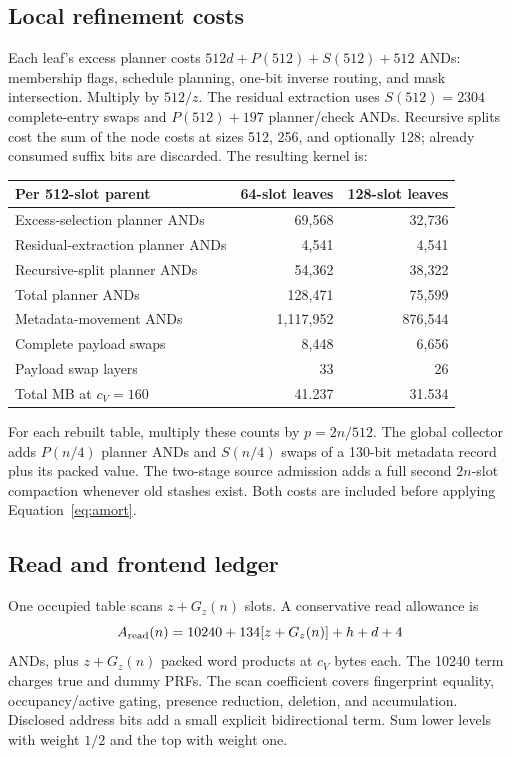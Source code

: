 \documentclass[11pt]{article}
\begin{document}
\subsection{Local refinement costs}
Each leaf's excess planner costs
$512d+P(512)+S(512)+512$ ANDs: membership flags, schedule planning,
one-bit inverse routing, and mask intersection. Multiply by $512/z$.
The residual extraction uses $S(512)=2304$ complete-entry swaps and
$P(512)+197$ planner/check ANDs. Recursive splits cost the sum of the
node costs at sizes 512, 256, and optionally 128; already consumed suffix
bits are discarded. The resulting kernel is:
\begin{center}\small
\begin{tabular}{lrr}\toprule
Per 512-slot parent & 64-slot leaves & 128-slot leaves\\\midrule
Excess-selection planner ANDs & 69,568 & 32,736\\
Residual-extraction planner ANDs & 4,541 & 4,541\\
Recursive-split planner ANDs & 54,362 & 38,322\\
Total planner ANDs & 128,471 & 75,599\\
Metadata-movement ANDs & 1,117,952 & 876,544\\
Complete payload swaps & 8,448 & 6,656\\
Payload swap layers & 33 & 26\\
Total MB at $c_V=160$ & 41.237 & 31.534\\
\bottomrule\end{tabular}\end{center}

For each rebuilt table, multiply these counts by $p=2n/512$. The global
collector adds $P(n/4)$ planner ANDs and $S(n/4)$ swaps of a 130-bit
metadata record plus its packed value. The two-stage source admission
adds a full second $2n$-slot compaction whenever old stashes exist.
Both costs are included before applying Equation~\eqref{eq:amort}.

\subsection{Read and frontend ledger}
One occupied table scans $z+G_z(n)$ slots. A conservative read allowance is
\begin{equation}\label{eq:read}
 A_{\rm read}(n)=10240+134[z+G_z(n)]+h+d+4
\end{equation}
ANDs, plus $z+G_z(n)$ packed word products at $c_V$ bytes each. The
10240 term charges true and dummy PRFs. The scan coefficient covers
fingerprint equality, occupancy/active gating, presence reduction, deletion,
and accumulation. Disclosed address bits add a small explicit bidirectional
term. Sum lower levels with weight $1/2$ and the top with weight one.
\end{document}
